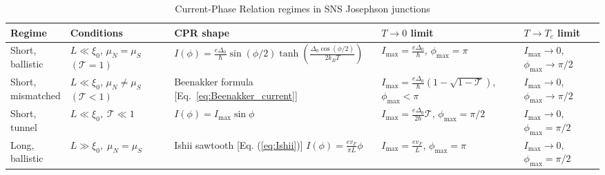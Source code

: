 \documentclass[11pt,a4paper,twoside,openany]{report}
\begin{document}
\begin{table}[H]
\centering
\caption{Current-Phase Relation regimes in SNS Josephson junctions}
\label{tab:sns_cpr_summary}
\small
\setlength{\tabcolsep}{4pt}
\begin{tabularx}{\textwidth}{>{\raggedright\arraybackslash}p{1.7cm} 
                              >{\raggedright\arraybackslash}p{2.7cm}
                              >{\raggedright\arraybackslash}p{5.8cm}
                              >{\raggedright\arraybackslash}p{3.7cm}
                              >{\raggedright\arraybackslash}p{1.8cm}}
\toprule
\textbf{Regime} & \textbf{Conditions} & \textbf{CPR shape} & \textbf{\(T \to 0\) limit} & \textbf{\(T \to T_c\) limit} \\
\midrule
\rowcolor{shortbg}
\makecell[l]{Short, \\ballistic} 
& \makecell[l]{\(L \ll \xi_0\),\\\(\mu_N = \mu_S\) $(\mathcal{T}=1)$} 
& \(I(\phi) = \frac{e\Delta_0}{\hbar}\sin(\phi/2)\tanh\!\left(\frac{\Delta_0\cos(\phi/2)}{2k_BT}\right)\) 
& \makecell[l]{\(I_{\max} = \frac{e\Delta_0}{\hbar}\),\\\( \phi_{\max} = \pi\)} 
& \makecell[l]{\(I_{\max} \to 0\),\\\(\phi_{\max} \to \pi/2\)} \\
\midrule
\rowcolor{shortbg}
\makecell[l]{Short, \\ mismatched} 
& \makecell[l]{\(L \ll \xi_0\),\\\(\mu_N \neq \mu_S\) $(\mathcal{T}<1)$} 
& Beenakker formula [Eq.~\eqref{eq:Beenakker_current}] 
& \makecell[l]{\(I_{\max} = \frac{e\Delta_0}{\hbar}(1-\sqrt{1-\mathcal{T}})\),\\\( \phi_{\max} < \pi\)}
& \makecell[l]{\(I_{\max} \to 0\),\\\(\phi_{\max} \to \pi/2\)} \\
\midrule
\rowcolor{shortbg}
\makecell[l]{Short, \\ tunnel} 
& \(L \ll \xi_0,\; \mathcal{T} \ll 1\) 
& \(I(\phi) = I_{\max}\sin\phi\) 
& \makecell[l]{\(I_{\max} = \frac{e\Delta_0}{2\hbar}\mathcal{T}\),\\\( \phi_{\max} = \pi/2\)} 
& \makecell[l]{\(I_{\max} \to 0\),\\\(\phi_{\max} = \pi/2\)} \\
\midrule
\rowcolor{longbg}
\makecell[l]{Long, \\ ballistic} 
& \(L \gg \xi_0,\; \mu_N = \mu_S\) 
& Ishii sawtooth [Eq. (\eqref{eq:Ishii})] \(I(\phi) = \frac{e v_F}{\pi L}\phi\) 
& \makecell[l]{\(I_{\max} = \frac{e v_F}{ L}\),\\\(\phi_{\max} = \pi\)}
& \makecell[l]{\(I_{\max} \to 0\),\\\(\phi_{\max} = \pi/2\)} \\
\bottomrule
\end{tabularx}
\vspace{6pt}
\end{table}
\end{document}
